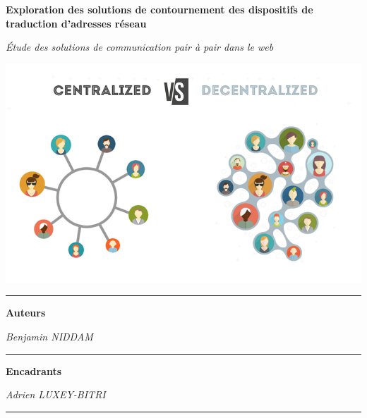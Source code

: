 \begin{titlepage}
    \begin{center}
        \vspace*{\fill}

        \textbf{\huge{Exploration des solutions de contournement des dispositifs de traduction d'adresses réseau}}\\

        \vspace{0.5cm}

        \textsl{\large{Étude des solutions de communication pair à pair dans le web}}\\

        \vspace{2cm}

        \includegraphics[scale=0.5]{./assets/logo.png}

        \vspace{2cm}

        \rule{\linewidth}{0.15mm}
        \textbf{Auteurs}

        \vspace{0.3cm}

        \small{\textit{Benjamin NIDDAM}} \\
        \rule{\linewidth}{0.15mm}
        \textbf{Encadrants}

        \vspace{0.3cm}

        \small{\textit{Adrien LUXEY-BITRI}} \\
        \rule{\linewidth}{0.15mm}

        \vspace{2cm}

        \vfill
        \date{13 juin 2023}
    \end{center}
    \vspace*{\fill}
\end{titlepage}